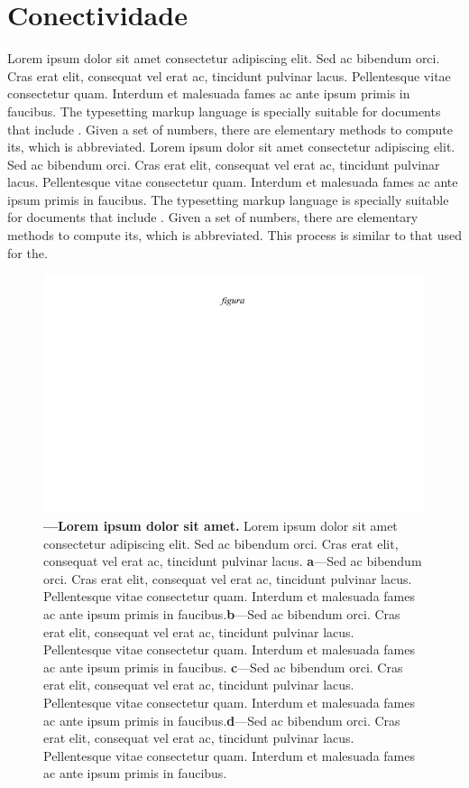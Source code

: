 \documentclass[./main.tex]{subfiles}
\begin{document}
\section{Conectividade}

\par Lorem ipsum dolor sit amet consectetur adipiscing elit. Sed ac bibendum orci. Cras erat elit, consequat vel erat ac, tincidunt pulvinar lacus. Pellentesque vitae consectetur quam. Interdum et malesuada fames ac ante ipsum primis in faucibus. The typesetting markup language is specially suitable for documents that include . Given a set of numbers, there are elementary methods to compute its, which is abbreviated. Lorem ipsum dolor sit amet consectetur adipiscing elit. Sed ac bibendum orci. Cras erat elit, consequat vel erat ac, tincidunt pulvinar lacus. Pellentesque vitae consectetur quam. Interdum et malesuada fames ac ante ipsum primis in faucibus. The typesetting markup language is specially suitable for documents that include . Given a set of numbers, there are elementary methods to compute its, which is abbreviated. This process is similar to that used for the. 

\begin{figure}[t!] 
\centering				
\includegraphics[width=0.98\linewidth]{figs/fig_m.jpg}		
\caption[Lorem ipsum dolor sit amet]
{\textbf{---\;Lorem ipsum dolor sit amet.}
    Lorem ipsum dolor sit amet consectetur adipiscing elit. Sed ac bibendum orci. Cras erat elit, consequat vel erat ac, tincidunt pulvinar lacus. \;\textbf{a}\;---\;Sed ac bibendum orci. Cras erat elit, consequat vel erat ac, tincidunt pulvinar lacus. Pellentesque vitae consectetur quam. Interdum et malesuada fames ac ante ipsum primis in faucibus.\;\textbf{b}\;---\;Sed ac bibendum orci. Cras erat elit, consequat vel erat ac, tincidunt pulvinar lacus. Pellentesque vitae consectetur quam. Interdum et malesuada fames ac ante ipsum primis in faucibus. \;\textbf{c}\;---\;Sed ac bibendum orci. Cras erat elit, consequat vel erat ac, tincidunt pulvinar lacus. Pellentesque vitae consectetur quam. Interdum et malesuada fames ac ante ipsum primis in faucibus.\;\textbf{d}\;---\;Sed ac bibendum orci. Cras erat elit, consequat vel erat ac, tincidunt pulvinar lacus. Pellentesque vitae consectetur quam. Interdum et malesuada fames ac ante ipsum primis in faucibus.
}
\label{fig:hydro:2} 		
\end{figure}
\end{document}
